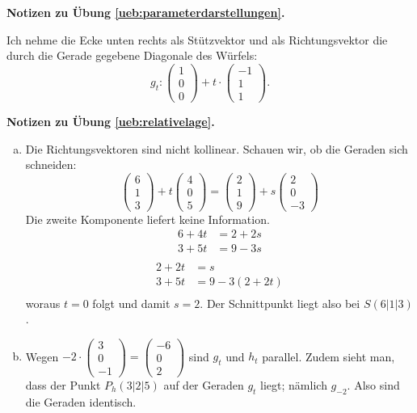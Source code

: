 \documentclass[%
11pt,%
twoside,%
titlepage,%
german,%
headsepline%
]{scrartcl}
\theoremstyle{definition}
\theoremstyle{plain}
\newcommand{\concatueb}[1]{ueb:#1}%
\newcommand{\concatlsg}[1]{lsg:#1}%
\newenvironment{lsg}[1]{%
    \par\noindent\textbf{Notizen zu Übung \ref{\concatueb{#1}}.}%
    \label{\concatlsg{#1}}
}{%
    \par%
}
\begin{document}
\begin{lsg}{parameterdarstellungen}
Ich nehme die Ecke unten rechts als Stützvektor und als Richtungsvektor die durch die Gerade gegebene Diagonale des Würfels:
$$g_t:\begin{pmatrix}
    1\\0\\0
\end{pmatrix}+t\cdot\begin{pmatrix}
    -1\\1\\1
\end{pmatrix}.$$
\end{lsg}
\begin{lsg}{relativelage}
\begin{enumerate}[a)]
    \item Die Richtungsvektoren sind nicht kollinear. Schauen wir, ob die Geraden sich schneiden:    $$\begin{pmatrix}6\\1\\3\end{pmatrix}+t\begin{pmatrix}4\\0\\5\end{pmatrix}=\begin{pmatrix}2\\1\\9\end{pmatrix}+s\begin{pmatrix}2\\0\\-3\end{pmatrix}$$
    Die zweite Komponente liefert keine Information.
    \begin{align*}
        6+4t &= 2+2s\\
        3+5t &= 9-3s\\
    \end{align*}
        \begin{align*}
        2+2t &= s\\
        3+5t &= 9-3(2+2t)\\
    \end{align*}
    woraus $t=0$ folgt und damit $s=2$. Der Schnittpunkt liegt also bei $S(6|1|3)$.

    \item Wegen $-2\cdot\begin{pmatrix}
        3\\0\\-1
    \end{pmatrix}=\begin{pmatrix}
        -6\\0\\2
    \end{pmatrix}$ sind $g_t$ und $h_t$ parallel. Zudem sieht man, dass der Punkt $P_h(3|2|5)$ auf der Geraden $g_t$ liegt; nämlich $g_{-2}$. Also sind die Geraden identisch.


\end{enumerate}
\end{lsg}
\end{document}
